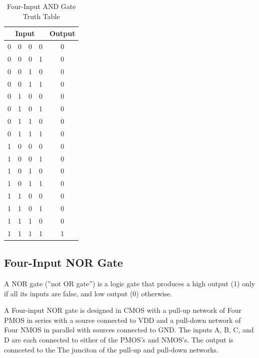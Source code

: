 \documentclass[conference]{IEEEtran}
\begin{document}
\begin{table}[htbp]
\caption{Four-Input AND Gate Truth Table}
\begin{center}
\begin{tabular}{|c|c|c|c|c|}
\hline
\multicolumn{4}{|c|}{\textbf{Input}} & \textbf{Output} \\
\hline
0 & 0 & 0 & 0 & 0 \\
\hline
0 & 0 & 0 & 1 & 0 \\
\hline
0 & 0 & 1 & 0 & 0 \\
\hline
0 & 0 & 1 & 1 & 0 \\
\hline
0 & 1 & 0 & 0 & 0 \\
\hline
0 & 1 & 0 & 1 & 0 \\
\hline
0 & 1 & 1 & 0 & 0 \\
\hline
0 & 1 & 1 & 1 & 0 \\
\hline
1 & 0 & 0 & 0 & 0 \\
\hline
1 & 0 & 0 & 1 & 0 \\
\hline
1 & 0 & 1 & 0 & 0 \\
\hline
1 & 0 & 1 & 1 & 0 \\
\hline
1 & 1 & 0 & 0 & 0 \\
\hline
1 & 1 & 0 & 1 & 0 \\
\hline
1 & 1 & 1 & 0 & 0 \\
\hline
1 & 1 & 1 & 1 & 1 \\
\hline
\end{tabular}
\end{center}
\end{table}

\subsection{Four-Input NOR Gate}

A NOR gate (''not OR gate'') is a logic gate that produces a high output (1) only if all its inputs are false, and low output (0) otherwise.

A Four-input NOR gate is designed in CMOS with a pull-up network of Four PMOS in series with a source connected to VDD and a pull-down network of Four NMOS in parallel with sources connected to GND. The inputs A, B, C, and D are each connected to either of the PMOS's and NMOS's. The output is connceted to the The junciton of the pull-up and pull-down networks.
\end{document}
